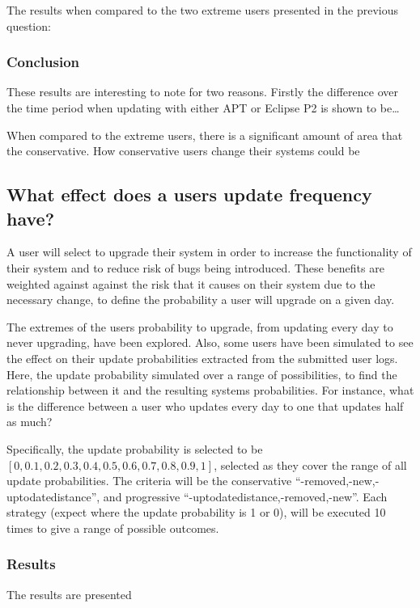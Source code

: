 The results when compared to the two extreme users presented in the previous question:

\subsubsection{Conclusion}
These results are interesting to note for two reasons. 
Firstly the difference over the time period when updating with either APT or Eclipse P2 is shown to be\ldots

When compared to the extreme users, there is a significant amount of area that the conservative.
How conservative users change their systems could be 

\subsection{What effect does a users update frequency have?}
A user will select to upgrade their system in order to increase the functionality of their system and to reduce risk of bugs being introduced.
These benefits are weighted against against the risk that it causes on their system due to the necessary change, to define the probability a user will upgrade on a given day.

The extremes of the users probability to upgrade, from updating every day to never upgrading, have been explored.
Also, some users have been simulated to see the effect on their update probabilities extracted from the submitted user logs.
Here, the update probability simulated over a range of possibilities, to find the relationship between it and the resulting systems probabilities.
For instance, what is the difference between a user who updates every day to one that updates half as much?

Specifically, the update probability is selected to be $[0,0.1,0.2,0.3,0.4,0.5,0.6,0.7,0.8,0.9,1]$,
selected as they cover the range of all update probabilities.  
The criteria will be the conservative ``-removed,-new,-uptodatedistance'', and progressive ``-uptodatedistance,-removed,-new''.
Each strategy (expect where the update probability is 1 or 0), will be executed 10 times to give a range of possible outcomes.

\subsubsection{Results}
The results are presented

